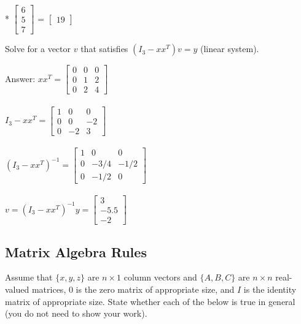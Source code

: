 \documentclass{article}
\def\ans#1{\par\gre{Answer: #1}}
\def\blu#1{{\color{blu}#1}}
\def\gre#1{{\color{gre}#1}}
\begin{document}
{{*
$\left[\begin{array}{c}
6\\
5\\
7
\end{array}\right]$
=
$\left[\begin{array}{c}
19
\end{array}\right]$
}
\item Solve for a vector $v$ that satisfies $(I_3 - xx^T)v = y$ (linear system).
\ans{
$xx^T = \left[\begin{array}{ccc}
0 & 0 & 0\\
0 & 1 & 2\\
0 & 2 & 4
\end{array}\right]$ \\\\
$I_3 - xx^T = \left[\begin{array}{ccc}
1 & 0 & 0\\
0 & 0 & -2\\
0 & -2 & 3
\end{array}\right]$ \\\\
$(I_3 - xx^T)^{-1} = \left[\begin{array}{ccc}
1 & 0 & 0\\
0 & -3/4 & -1/2\\
0 & -1/2 & 0
\end{array}\right]$ \\\\
$v = (I_3 - xx^T)^{-1}y =  \left[\begin{array}{c}
3\\
-5.5\\
-2
\end{array}\right]$
}
}

\pagebreak
\subsection{Matrix Algebra Rules}

Assume that $\{x,y,z\}$ are $n \times 1$ column vectors and $\{A,B,C\}$ are $n \times n$ real-valued matrices, $0$ is the zero matrix of appropriate size, and $I$ is the identity matrix of appropriate size. \blu{State whether each of the below is true in general} (you do not need to show your work).
\end{document}
